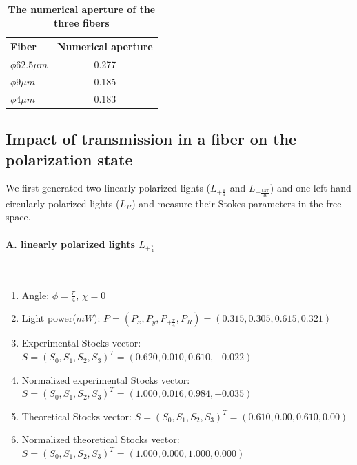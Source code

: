 \documentclass[10pt,a4paper,twocolumn,twoside,UTF8]{article}
\begin{document}
	\begin{table}[htbp]
		\centering
			\begin{tabular}{lc}
				\toprule
				Fiber & Numerical aperture \\
				\midrule
				$\phi 62.5\mu m$ & 0.277 \\
				$\phi 9\mu m$ & 0.185 \\
				$\phi 4\mu m$ & 0.183 \\
				\bottomrule
			\end{tabular}
			\caption{\textbf{The numerical aperture of the three fibers}}
			\label{tab.2.1}
	\end{table}

	\subsection{Impact of transmission in a fiber on the polarization state}
	We first generated two linearly polarized lights ($L_{+\frac{\pi}{4}}$ and $L_{+\frac{13\pi}{36}}$) and one left-hand circularly polarized lights ($L_R$) and measure their Stokes parameters in the free space.

	\paragraph{A. linearly polarized lights $L_{+\frac{\pi}{4}}$}~
	\newline 
	\indent
	\begin{enumerate}[label=\arabic*.]
		\item Angle: $\phi = \frac{\pi}{4}$, $\chi = 0$
		\item Light power($mW$): $P = (P_x, P_y, P_{+\frac{\pi}{4}}, P_R) = (0.315, 0.305, 0.615, 0.321)$
		\item Experimental Stocks vector: 
		$S=(S_0, S_1, S_2, S_3)^T = (0.620, 0.010, 0.610, -0.022)$
		\item Normalized experimental Stocks vector: $S=(S_0, S_1, S_2, S_3)^T = (1.000, 0.016, 0.984, -0.035)$
		\item Theoretical Stocks vector: $S=(S_0, S_1, S_2, S_3)^T = (0.610, 0.00, 0.610, 0.00)$
		\item Normalized theoretical Stocks vector: $S=(S_0, S_1, S_2, S_3)^T = (1.000, 0.000, 1.000, 0.000)$
	\end{enumerate}
\end{document}

